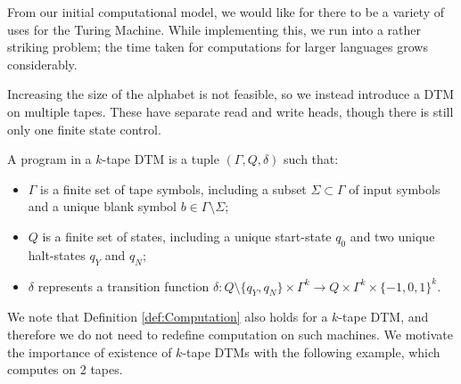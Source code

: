 From our initial computational model, we would like for there to be a variety of uses for the Turing Machine. While implementing this, we run into a rather striking problem; the time taken for computations for larger languages grows considerably.

Increasing the size of the alphabet is not feasible, so we instead introduce a DTM on multiple tapes. These have separate read and write heads, though there is still only one finite state control.



\newpage
\begin{definition}
    A program in a $k$-tape DTM is a tuple $(\Gamma,Q,\delta)$ such that:
    \begin{itemize}
        \item $\Gamma$ is a finite set of tape symbols, including a subset $\Sigma \subset \Gamma$ of input symbols and a unique blank symbol $b \in \Gamma \setminus \Sigma$;
        \item $Q$ is a finite set of states, including a unique start-state $q_0$ and two unique halt-states $q_Y$ and $q_N$;
        \item $\delta$ represents a transition function $\delta: Q \setminus \{q_Y,q_N\} \times \Gamma^k \to Q \times \Gamma^k \times \{-1,0,1\}^k$.
    \end{itemize}
\end{definition}

We note that Definition \ref{def:Computation} also holds for a $k$-tape DTM, and therefore we do not need to redefine computation on such machines. We motivate the importance of existence of $k$-tape DTMs with the following example, which computes on 2 tapes.

